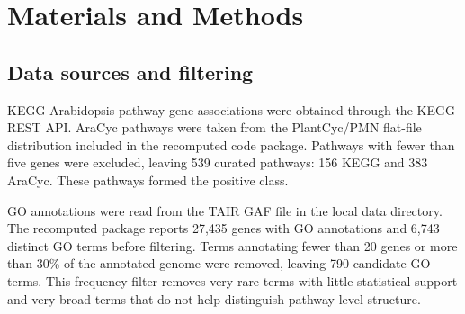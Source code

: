 \documentclass[11pt]{article}
\begin{document}
\section{Materials and Methods}
\subsection{Data sources and filtering}
KEGG Arabidopsis pathway-gene associations were obtained through the KEGG REST API. AraCyc pathways were taken from the PlantCyc/PMN flat-file distribution included in the recomputed code package. Pathways with fewer than five genes were excluded, leaving 539 curated pathways: 156 KEGG and 383 AraCyc. These pathways formed the positive class.

GO annotations were read from the TAIR GAF file in the local data directory. The recomputed package reports 27,435 genes with GO annotations and 6,743 distinct GO terms before filtering. Terms annotating fewer than 20 genes or more than 30\% of the annotated genome were removed, leaving 790 candidate GO terms. This frequency filter removes very rare terms with little statistical support and very broad terms that do not help distinguish pathway-level structure.

\begin{table}[H]
\centering
\caption{Dataset and feature summary from the recomputed seed-42 source-of-truth run.}
\label{tab:1}
\scriptsize
{}
\end{table}
\end{document}
